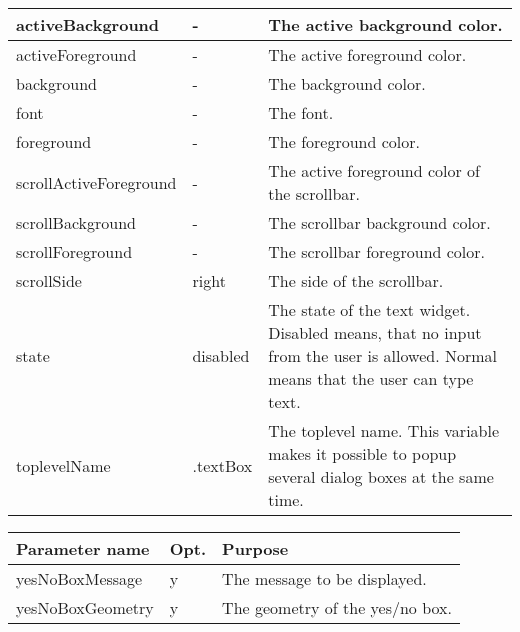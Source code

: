 {\newpage
\clearpage
\samepage \begin{supertabular}{|l|l|p{5.3cm}|}
activeBackground       & -        & The active background
                                    color.\\  \hline
activeForeground       & -        & The active foreground
                                    color.\\  \hline
background             & -        & The background color.\\  \hline
font                   & -        & The font.\\  \hline
foreground             & -        & The foreground color.\\  \hline
scrollActiveForeground & -        & The active foreground
                                    color of the scrollbar.\\  \hline
scrollBackground       & -        & The scrollbar background
                                    color.\\  \hline
scrollForeground       & -        & The scrollbar foreground
                                    color.\\  \hline
scrollSide             & right    & The side of the
                                    scrollbar.\\  \hline
state                  & disabled & The state of the text
                                    widget. Disabled means,
                                    that no input from the
                                    user is allowed. Normal
                                    means that the user can
                                    type text.\\  \hline
toplevelName           & .textBox & The toplevel name. This
                                    variable makes it
                                    possible to popup
                                    several dialog boxes at
                                    the same time.\\  \hline
\end{supertabular}
}

{\newpage
\clearpage
\samepage \begin{figure}[ht]
  \centerline{
  \epsfysize=3.3cm
  }

  \label{fig:TextBox}
\end{figure}
}

{\newpage
\clearpage
\samepage \begin{tabular}{|l|l|p{6.5cm}|} \hline
Parameter name   & Opt. & Purpose\\  \hline
yesNoBoxMessage  & y    & The message to be displayed.\\  \hline
yesNoBoxGeometry & y    & The geometry of the yes/no box.\\  \hline
\end{tabular}
}

